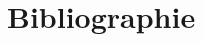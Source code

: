 \section{Bibliographie}
\nocite{*}
\begingroup
\setlength{\emergencystretch}{2em}
\printbibliography[heading=none]
\endgroup
